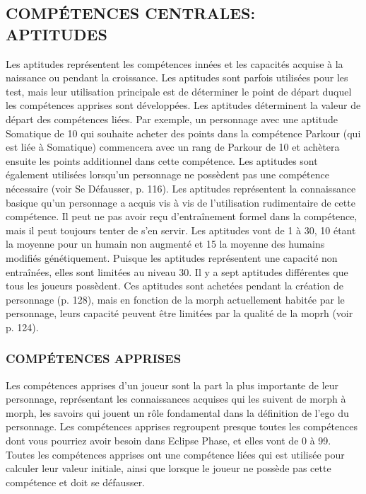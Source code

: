 \subsection{COMPÉTENCES CENTRALES: APTITUDES} Les aptitudes représentent les compétences innées et les capacités acquise à la naissance ou pendant la croissance. Les aptitudes sont parfois utilisées pour les test, mais leur utilisation principale est de déterminer le point de départ duquel les compétences apprises sont développées. Les aptitudes déterminent la valeur de départ des compétences liées. Par exemple, un personnage avec une aptitude Somatique de 10 qui souhaite acheter des points dans la compétence Parkour (qui est liée à Somatique) commencera avec un rang de Parkour de 10 et achètera ensuite les points additionnel dans cette compétence. Les aptitudes sont également utilisées lorsqu'un personnage ne possèdent pas une compétence nécessaire (voir Se Défausser, p. 116). Les aptitudes représentent la connaissance basique qu'un personnage a acquis vis à vis de l'utilisation rudimentaire de cette compétence. Il peut ne pas avoir reçu d'entraînement formel dans la compétence, mais il peut toujours tenter de s'en servir. Les aptitudes vont de 1 à 30, 10 étant la moyenne pour un humain non augmenté et 15 la moyenne des humains modifiés génétiquement. Puisque les aptitudes représentent une capacité non entraînées, elles sont limitées au niveau 30. Il y a sept aptitudes différentes que tous les joueurs possèdent. Ces aptitudes sont achetées pendant la création de personnage (p. 128), mais en fonction de la morph actuellement habitée par le personnage, leurs capacité peuvent être limitées par la qualité de la moprh (voir p. 124). 

\subsubsection{COMPÉTENCES APPRISES} Les compétences apprises d'un joueur sont la part la plus importante de leur personnage, représentant les connaissances acquises qui les suivent de morph à morph, les savoirs qui jouent un rôle fondamental dans la définition de l'ego du personnage. Les compétences apprises regroupent presque toutes les compétences dont vous pourriez avoir besoin dans Eclipse Phase, et elles vont de 0 à 99. Toutes les compétences apprises ont une compétence liées qui est utilisée pour calculer leur valeur initiale, ainsi que lorsque le joueur ne possède pas cette compétence et doit se défausser. 



